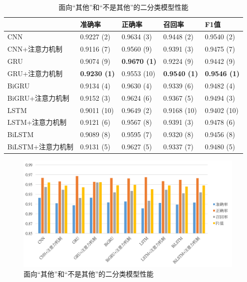 \begin{table}[htb]
  \centering
  \begin{minipage}[t]{\linewidth}
  \caption{面向“其他”和“不是其他”的二分类模型性能}
  \label{tab:exp_context_emo_b_result}
    \begin{tabularx}{\linewidth}{X|llll}
    \toprule[1.5pt]
    & 准确率 & 正确率 & 召回率 & F1值 \\
    \hline
    CNN & 0.9227 (2) & 0.9634 (3) & 0.9448 (2) & 0.9540 (2) \\ %
    CNN+注意力机制 & 0.9116 (7) & 0.9560 (9) & 0.9391 (3) & 0.9475 (7) \\ %
    \hline
    GRU & 0.9074 (9) & \bf 0.9670 (1) & 0.9224 (9) & 0.9442 (9) \\ %
    GRU+注意力机制 & \bf 0.9230 (1) & 0.9553 (10) & \bf 0.9540 (1) & \bf 0.9546 (1) \\ %
    \hline
    BiGRU & 0.9134 (4) & 0.9630 (4) & 0.9339 (6) & 0.9482 (4) \\ %
    BiGRU+注意力机制 & 0.9152 (3) & 0.9624 (6) & 0.9367 (5) & 0.9494 (3) \\ %
    \hline
    LSTM & 0.9011 (10) & 0.9649 (2) & 0.9168 (10) & 0.9402 (10) \\ %
    LSTM+注意力机制 & 0.9121 (6) & 0.9567 (8) & 0.9391 (3) & 0.9478 (6) \\ %
    \hline
    BiLSTM & 0.9089 (8) & 0.9595 (7) & 0.9320 (8) & 0.9456 (8) \\ %
    BiLSTM+注意力机制 & 0.9131 (5) & 0.9627 (5) & 0.9337 (7) & 0.9480 (5) \\ %
    \bottomrule[1.5pt]
    \end{tabularx}
  \end{minipage}
\end{table}

\begin{figure}[H]
  \centering
  \includegraphics[width=\textwidth]{img/exp_context_emo_b_result_bar.png}
  \caption{面向“其他”和“不是其他”的二分类模型性能}
  \label{fig:exp_context_emo_b_result_bar}
\end{figure}

